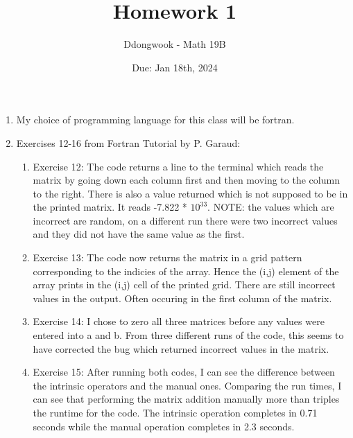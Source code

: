 \documentclass[11pt]{article}
\title{Homework 1}
\author{Ddongwook - Math 19B}
\date{Due: Jan 18th, 2024}
\begin{document}
\maketitle

\noindent 
\normalsize

\begin{enumerate}
\item 
My choice of programming language for this class will be fortran. 

\item 
Exercises 12-16 from Fortran Tutorial by P. Garaud:
\begin{enumerate}
    \item Exercise 12: The code returns a line to the terminal which reads the matrix by going down each column first and then moving to the column to the right. There is also a value returned which is not supposed to be in the printed matrix. It reads -7.822 * $10^{33}$. NOTE: the values which are incorrect are random, on a different run there were two incorrect values and they did not have the same value as the first. 

    \item Exercise 13: The code now returns the matrix in a grid pattern corresponding to the indicies of the array. Hence the (i,j) element of the array prints in the (i,j) cell of the printed grid. There are still incorrect values in the output. Often occuring in the first column of the matrix.  

    \item Exercise 14: I chose to zero all three matrices before any values were entered into a and b. From three different runs of the code, this seems to have corrected the bug which returned incorrect values in the matrix. 

    \item Exercise 15: After running both codes, I can see the difference between the intrinsic operators and the manual ones. Comparing the run times, I can see that performing the matrix addition manually more than triples the runtime for the code. The intrinsic operation completes in 0.71 seconds while the manual operation completes in 2.3 seconds. 


\end{enumerate}
\end{enumerate}
\end{document}
